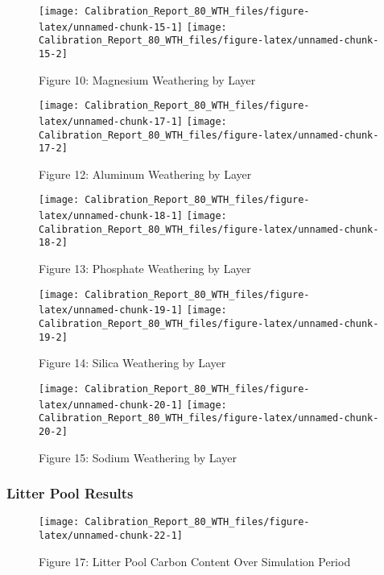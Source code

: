\documentclass[
]{article}
\begin{document}
\begin{figure}[H]
\texttt{[image: Calibration\_Report\_80\_WTH\_files/figure-latex/unnamed-chunk-15-1]} \texttt{[image: Calibration\_Report\_80\_WTH\_files/figure-latex/unnamed-chunk-15-2]} \caption{Figure 10: Magnesium Weathering by Layer}\label{fig:unnamed-chunk-15}
\end{figure}

\begin{figure}[H]
\texttt{[image: Calibration\_Report\_80\_WTH\_files/figure-latex/unnamed-chunk-17-1]} \texttt{[image: Calibration\_Report\_80\_WTH\_files/figure-latex/unnamed-chunk-17-2]} \caption{Figure 12: Aluminum Weathering by Layer}\label{fig:unnamed-chunk-17}
\end{figure}

\begin{figure}[H]
\texttt{[image: Calibration\_Report\_80\_WTH\_files/figure-latex/unnamed-chunk-18-1]} \texttt{[image: Calibration\_Report\_80\_WTH\_files/figure-latex/unnamed-chunk-18-2]} \caption{Figure 13: Phosphate Weathering by Layer}\label{fig:unnamed-chunk-18}
\end{figure}

\begin{figure}[H]
\texttt{[image: Calibration\_Report\_80\_WTH\_files/figure-latex/unnamed-chunk-19-1]} \texttt{[image: Calibration\_Report\_80\_WTH\_files/figure-latex/unnamed-chunk-19-2]} \caption{Figure 14: Silica Weathering by Layer}\label{fig:unnamed-chunk-19}
\end{figure}

\begin{figure}[H]
\texttt{[image: Calibration\_Report\_80\_WTH\_files/figure-latex/unnamed-chunk-20-1]} \texttt{[image: Calibration\_Report\_80\_WTH\_files/figure-latex/unnamed-chunk-20-2]} \caption{Figure 15: Sodium Weathering by Layer}\label{fig:unnamed-chunk-20}
\end{figure}

\hypertarget{litter-pool-results}{%
\subsubsection{Litter Pool Results}\label{litter-pool-results}}

\begin{figure}[H]
\texttt{[image: Calibration\_Report\_80\_WTH\_files/figure-latex/unnamed-chunk-22-1]} \caption{Figure 17: Litter Pool Carbon Content Over Simulation Period}\label{fig:unnamed-chunk-22}
\end{figure}
\end{document}
